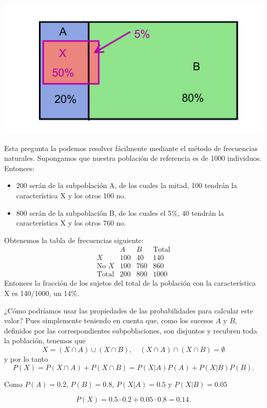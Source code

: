 \documentclass[
]{book}
\theoremstyle{definition}
\theoremstyle{definition}
\theoremstyle{definition}
\theoremstyle{definition}
\theoremstyle{remark}
\begin{document}
\begin{center}\includegraphics[width=0.8\linewidth]{INREMDN_files/figure-html/TPT} \end{center}

Esta pregunta la podemos resolver fácilmente mediante el método de frecuencias naturales. Supongamos que nuestra población de referencia es de 1000 individuos. Entonces:

\begin{itemize}
\item
  200 serán de la subpoblación A, de los cuales la mitad, 100 tendrán la característica X y los otros 100 no.
\item
  800 serán de la subpoblación B, de los cuales el 5\%, 40 tendrán la característica X y los otros 760 no.
\end{itemize}

Obtenemos la tabla de frecuencias siguiente:
\[
\begin{array}{r|c|c|c}
& A & B & \text{Total}\\\hline
X &100 & 40 &140\\ \hline
\text{No }X &100 & 760 &860\\\hline
\text{Total} &200 & 800 & 1000
\end{array}
\]
Entonces la fracción de los sujetos del total de la población con la característica X es 140/1000, un 14\%.

¿Cómo podríamos usar las propiedades de las probabilidades para calcular este valor? Pues simplemente teniendo en cuenta que, como los sucesos \(A\) y \(B\), definidos por las correspondientes subpoblaciones, son disjuntos y recubren toda la población, tenemos que
\[
X=(X\cap A)\cup (X\cap B),\quad (X\cap A)\cap (X\cap B)=\emptyset
\]
y por lo tanto
\[
P(X)=P(X\cap A)+P(X\cap B)=P(X|A)P(A)+P(X|B)P(B).
\]

Como \(P(A)=0.2\), \(P(B)=0.8\), \(P(X|A)=0.5\) y \(P(X|B)=0.05\)

\[
P(X)=0.5\cdot 0.2+0.05\cdot 0.8=0.14.
\]
\end{document}
